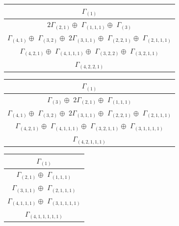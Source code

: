 \documentclass[main.tex]{subfiles}
\begin{document}
\bigskip
\begin{minipage}{.5\textwidth}
\centering
\begin{tabular}{c}
$\Gamma_{(
1
)}$
\\ \hline
$2\Gamma_{(
2 , 
1
)} \oplus$
$\Gamma_{(
1 , 
1 , 
1
)} \oplus$
$\Gamma_{(
3
)} $
\\ \hline
$\Gamma_{(
4 , 
1
)} \oplus$
$\Gamma_{(
3 , 
2
)} \oplus$
$2\Gamma_{(
3 , 
1 , 
1
)} \oplus$
$\Gamma_{(
2 , 
2 , 
1
)} \oplus$
$\Gamma_{(
2 , 
1 , 
1 , 
1
)}$
\\ \hline
$\Gamma_{(
4 , 
2 , 
1
)} \oplus$
$\Gamma_{(
4 , 
1 , 
1 , 
1
)} \oplus$
$\Gamma_{(
3 , 
2 , 
2
)} \oplus$
$\Gamma_{(
3 , 
2 , 
1 , 
1
)}$
\\ \hline
$\Gamma_{(
4 , 
2 , 
2 , 
1
)}$
\\
\end{tabular}\end{minipage}
\begin{minipage}{.5\textwidth}
\centering
\begin{tabular}{c}
$\Gamma_{(
1
)}$
\\ \hline
$\Gamma_{(
3
)} \oplus$
$2\Gamma_{(
2 , 
1
)} \oplus$
$\Gamma_{(
1 , 
1 , 
1
)}$
\\ \hline
$\Gamma_{(
4 , 
1
)} \oplus$
$\Gamma_{(
3 , 
2
)} \oplus$
$2\Gamma_{(
3 , 
1 , 
1
)} \oplus$
$\Gamma_{(
2 , 
2 , 
1
)} \oplus$
$\Gamma_{(
2 , 
1 , 
1 , 
1
)}$
\\ \hline
$\Gamma_{(
4 , 
2 , 
1
)} \oplus$
$\Gamma_{(
4 , 
1 , 
1 , 
1
)} \oplus$
$\Gamma_{(
3 , 
2 , 
1 , 
1
)} \oplus$
$\Gamma_{(
3 , 
1 , 
1 , 
1 , 
1
)}$
\\ \hline
$\Gamma_{(
4 , 
2 , 
1 , 
1 , 
1
)}$
\\
\end{tabular}\end{minipage}
\bigskip
\begin{minipage}{.3\textwidth}
\centering
\begin{tabular}{c}
$\Gamma_{(
1
)}$
\\ \hline
$\Gamma_{(
2 , 
1
)} \oplus$
$\Gamma_{(
1 , 
1 , 
1
)}$
\\ \hline
$\Gamma_{(
3 , 
1 , 
1
)} \oplus$
$\Gamma_{(
2 , 
1 , 
1 , 
1
)}$
\\ \hline
$\Gamma_{(
4 , 
1 , 
1 , 
1
)} \oplus$
$\Gamma_{(
3 , 
1 , 
1 , 
1 , 
1
)}$
\\ \hline
$\Gamma_{(
4 , 
1 , 
1 , 
1 , 
1 , 
1
)}$
\\
\end{tabular}\end{minipage}
\end{document}
